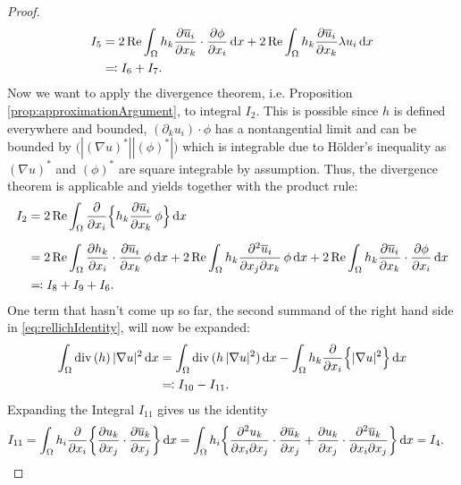 \begin{proof}
\begin{align*}
     I_5 
     &= 2 \operatorname{Re} \int_\Omega h_k \frac{\partial \overline u_i}{\partial x_k}\cdot  \frac{\partial \phi}{\partial x_i} \, {\operatorname{d}\!{x}} + 2\operatorname{Re} \int_\Omega h_k \frac{\partial\overline u_i}{\partial x_k} \lambda u_i \, {\operatorname{d}\!{x}} \\
     &\eqqcolon I_6 + I_7 .
  \end{align*}
  Now we want to apply the divergence theorem, i.e. Proposition \ref{prop:approximationArgument}, to integral $I_2$.
  This is possible since $h$ is defined everywhere and bounded, $(\partial_k u_i) \cdot \phi$ has a nontangential limit and can be bounded by $\big( |(\nabla u)^*| |(\phi)^*| \big)$ which is integrable due to Hölder's inequality as $(\nabla u)^*$ and $(\phi)^*$ are square integrable by assumption.
  Thus, the divergence theorem is applicable and yields together with the product rule:
  \begin{align*}
    I_2
    &= 2 \operatorname{Re} \int_\Omega \frac{\partial}{\partial x_i} \Big\{ h_k \frac{\partial \overline u_i}{\partial x_k} \, \phi \Big\} \, {\operatorname{d}\!{x}} \\[0.5em]
    &= 2 \operatorname{Re} \int_\Omega \frac{\partial h_k}{\partial x_i} \cdot \frac{\partial \overline u_i}{\partial x_k} \, \phi \, {\operatorname{d}\!{x}} + 2 \operatorname{Re} \int_\Omega h_k \frac{\partial^2 \overline u_i}{\partial x_j \partial x_k} \, \phi \, {\operatorname{d}\!{x}} + 2 \operatorname{Re} \int_\Omega h_k \frac{\partial \overline u_i}{\partial x_k} \cdot \frac{\partial \phi}{\partial x_i} \, {\operatorname{d}\!{x}}\\
    &\eqqcolon I_8 + I_9 + I_6.
  \end{align*}
  One term that hasn't come up so far, the second summand of the right hand side in \eqref{eq:rellichIdentity}, will now be expanded:
  \begin{align*}
    \int_\Omega \mathrm{div\,} (h)\,  |\nabla u|^2 \, {\operatorname{d}\!{x}}
    &= \int_\Omega \mathrm{div\,} ( h\,|\nabla u|^2) \, {\operatorname{d}\!{x}} - \int_\Omega h_k \frac{\partial}{\partial x_i} \Big\{ |\nabla u|^2 \Big\} \, {\operatorname{d}\!{x}} \\
    &\eqqcolon I_{10} - I_{11}.
  \end{align*}
  Expanding the Integral $I_{11}$ gives us the identity
  \begin{align*}
    I_{11}
    &= \int_\Omega h_i \frac{\partial}{\partial x_i} \bigg\{ \frac{\partial u_k}{\partial x_j} \cdot \frac{\partial \overline u_k}{\partial x_j} \bigg\} \, {\operatorname{d}\!{x}}
    = \int_\Omega h_i  \bigg\{ \frac{\partial^2 u_k}{\partial x_i \partial x_j} \cdot \frac{\partial \overline u_k}{\partial x_j} + \frac{\partial u_k}{\partial x_j} \cdot \frac{\partial^2 \overline u_k}{\partial x_i \partial x_j} \bigg\} \, {\operatorname{d}\!{x}}= I_4.
  \end{align*}

\end{proof}
